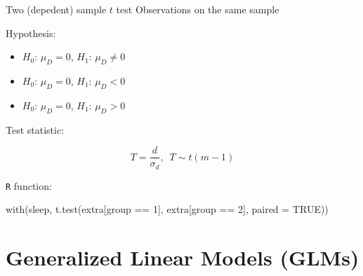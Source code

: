 \documentclass[
  ignorenonframetext,
]{beamer}
\newenvironment{Shaded}{\begin{snugshade}}{\end{snugshade}}
\newcommand{\AttributeTok}[1]{\textcolor[rgb]{0.00,0.34,0.68}{#1}}
\newcommand{\ConstantTok}[1]{\textcolor[rgb]{0.67,0.33,0.00}{#1}}
\newcommand{\DecValTok}[1]{\textcolor[rgb]{0.69,0.50,0.00}{#1}}
\newcommand{\FunctionTok}[1]{\textcolor[rgb]{0.39,0.29,0.61}{#1}}
\newcommand{\NormalTok}[1]{\textcolor[rgb]{0.12,0.11,0.11}{#1}}
\newcommand{\SpecialCharTok}[1]{\textcolor[rgb]{0.24,0.68,0.91}{#1}}
\providecommand{\tightlist}{%
  \setlength{\itemsep}{0pt}\setlength{\parskip}{0pt}}
\begin{document}
\begin{frame}[fragile]{Two (depedent) sample \(t\) test}
\protect\hypertarget{two-depedent-sample-t-test}{}
Observations on the same sample

Hypothesis:

\begin{itemize}
\tightlist
\item
  \(H_0\): \(\mu_{D} = 0\), \(H_1\): \(\mu_{D} \neq 0\)
\item
  \(H_0\): \(\mu_{D} = 0\), \(H_1\): \(\mu_{D} < 0\)
\item
  \(H_0\): \(\mu_{D} = 0\), \(H_1\): \(\mu_{D} > 0\)
\end{itemize}

Test statistic:

\[T = \frac{d}{\sigma_{d}}, \, \, \, T \sim t(m-1)\]

\texttt{R} function:

\begin{Shaded}
\begin{Highlighting}[]
\FunctionTok{with}\NormalTok{(sleep,}
     \FunctionTok{t.test}\NormalTok{(extra[group }\SpecialCharTok{==} \DecValTok{1}\NormalTok{],}
\NormalTok{            extra[group }\SpecialCharTok{==} \DecValTok{2}\NormalTok{], }\AttributeTok{paired =} \ConstantTok{TRUE}\NormalTok{))}
\end{Highlighting}
\end{Shaded}
\end{frame}

\hypertarget{generalized-linear-models-glms}{%
\section{Generalized Linear Models
(GLMs)}\label{generalized-linear-models-glms}}
\end{document}
